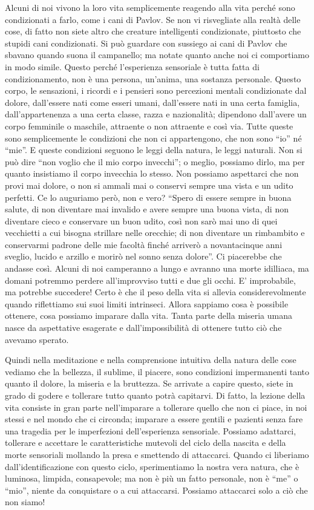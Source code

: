 Alcuni di noi vivono la loro vita semplicemente reagendo alla vita
perché sono condizionati a farlo, come i cani di Pavlov. Se non vi
risvegliate alla realtà delle cose, di fatto non siete altro che
creature intelligenti condizionate, piuttosto che stupidi cani
condizionati. Si può guardare con sussiego ai cani di Pavlov che sbavano
quando suona il campanello; ma notate quanto anche noi ci comportiamo in
modo simile. Questo perché l'esperienza sensoriale è tutta fatta di
condizionamento, non è una persona, un'anima, una sostanza personale.
Questo corpo, le sensazioni, i ricordi e i pensieri sono percezioni
mentali condizionate dal dolore, dall'essere nati come esseri umani,
dall'essere nati in una certa famiglia, dall'appartenenza a una certa
classe, razza e nazionalità; dipendono dall'avere un corpo femminile o
maschile, attraente o non attraente e così via. Tutte queste sono
semplicemente le condizioni che non ci appartengono, che non sono ``io”
né ``mie”. E queste condizioni seguono le leggi della natura, le leggi
naturali. Non si può dire ``non voglio che il mio corpo invecchi''; o
meglio, possiamo dirlo, ma per quanto insistiamo il corpo invecchia lo
stesso. Non possiamo aspettarci che non provi mai dolore, o non si
ammali mai o conservi sempre una vista e un udito perfetti. Ce lo
auguriamo però, non e vero? ``Spero di essere sempre in buona salute, di
non diventare mai invalido e avere sempre una buona vista, di non
diventare cieco e conservare un buon udito, così non sarò mai uno di
quei vecchietti a cui bisogna strillare nelle orecchie; di non diventare
un rimbambito e conservarmi padrone delle mie facoltà finché arriverò a
novantacinque anni sveglio, lucido e arzillo e morirò nel sonno senza
dolore''. Ci piacerebbe che andasse così. Alcuni di noi camperanno a
lungo e avranno una morte idilliaca, ma domani potremmo perdere
all'improvviso tutti e due gli occhi. E' improbabile, ma potrebbe
succedere! Certo è che il peso della vita si allevia considerevolmente
quando riflettiamo sui suoi limiti intrinseci. Allora sappiamo cosa è
possibile ottenere, cosa possiamo imparare dalla vita. Tanta parte della
miseria umana nasce da aspettative esagerate e dall'impossibilità di
ottenere tutto ciò che avevamo sperato.

Quindi nella meditazione e nella comprensione intuitiva della natura
delle cose vediamo che la bellezza, il sublime, il piacere, sono
condizioni impermanenti tanto quanto il dolore, la miseria e la
bruttezza. Se arrivate a capire questo, siete in grado di godere e
tollerare tutto quanto potrà capitarvi. Di fatto, la lezione della vita
consiste in gran parte nell'imparare a tollerare quello che non ci
piace, in noi stessi e nel mondo che ci circonda; imparare a essere
gentili e pazienti senza fare una tragedia per le imperfezioni
dell'esperienza sensoriale. Possiamo adattarci, tollerare e accettare le
caratteristiche mutevoli del ciclo della nascita e della morte
sensoriali mollando la presa e smettendo di attaccarci. Quando ci
liberiamo dall'identificazione con questo ciclo, sperimentiamo la nostra
vera natura, che è luminosa, limpida, consapevole; ma non è più un fatto
personale, non è ``me” o ``mio”, niente da conquistare o a cui attaccarsi.
Possiamo attaccarci solo a ciò che non siamo!

